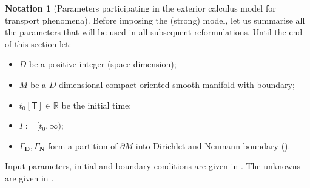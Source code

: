 \documentclass{elsarticle}
\theoremstyle{definition}
\newtheorem{notation}[theorem]{Notation}
\newcommand{\R}{\mathbb{R}}
\renewcommand{\time}{\mathsf{T}}
\newcommand{\Dirichlet}{\mathbf{D}}
\newcommand{\Neumann}{\mathbf{N}}
\begin{document}
\begin{notation}[Parameters participating in the exterior calculus model for transport phenomena]
  \label{notation:continuum/parameters}
  Before imposing the (strong) model, let us summarise all the parameters that will be used in all subsequent reformulations.
  Until the end of this section let:
  \begin{itemize}
    \item
      $D$ be a positive integer (space dimension);
    \item
      $M$ be a $D$-dimensional compact oriented smooth manifold with boundary;
    \item
      $t_0 [\time] \in \R$ be the initial time;
    \item
      $I := [t_0, \infty)$;
    \item
      $\Gamma_{\Dirichlet}, \Gamma_{\Neumann}$ form a partition of $\partial M$ into Dirichlet and Neumann boundary
      ().
  \end{itemize}
  Input parameters, initial and boundary conditions are given in .
  The unknowns are given in .
\end{notation}
\end{document}

